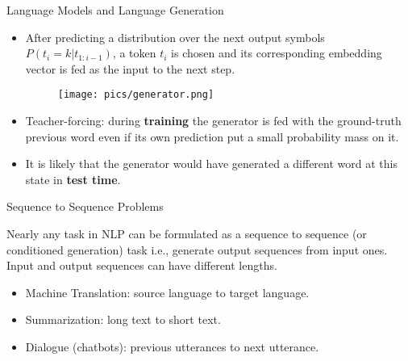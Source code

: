 \documentclass[handout]{beamer}
\begin{document}
\begin{frame}{Language Models and Language Generation}
\begin{scriptsize}
\begin{itemize}
\item After predicting a distribution over the next output symbols $P(t_i = k | t_{1:i-1})$, a token $t_i$ is chosen and its corresponding embedding vector is fed as the input to the next step.
         \begin{figure}[h]
        	\texttt{[image: pics/generator.png]}
        \end{figure}  
        
\item Teacher-forcing: during \textbf{training} the generator is fed with the ground-truth previous word even if its own prediction put a small probability mass on it. 
\item It is likely that the generator would have generated a different word at this state in \textbf{test time}.        
\end{itemize}
        
        
\end{scriptsize}
\end{frame}




\begin{frame}{Sequence to Sequence Problems}
\begin{scriptsize}
Nearly any task in NLP can be formulated as a sequence to sequence (or conditioned generation) task i.e., generate output sequences from input ones. Input and output sequences can have different lengths.
\begin{itemize}
\item Machine Translation: source language to target language.
\item Summarization: long text to short text.
\item Dialogue (chatbots): previous utterances to next utterance.
\end{itemize}
\end{scriptsize}
\end{frame}
\end{document}
